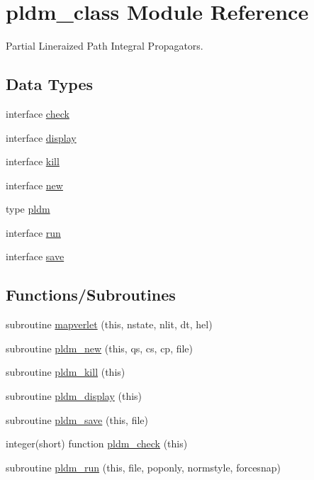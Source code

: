 \hypertarget{namespacepldm__class}{}\section{pldm\+\_\+class Module Reference}
\label{namespacepldm__class}


Partial Lineraized Path Integral Propagators.  


\subsection*{Data Types}
\begin{DoxyCompactItemize}
\item 
interface \hyperlink{interfacepldm__class_1_1check}{check}
\item 
interface \hyperlink{interfacepldm__class_1_1display}{display}
\item 
interface \hyperlink{interfacepldm__class_1_1kill}{kill}
\item 
interface \hyperlink{interfacepldm__class_1_1new}{new}
\item 
type \hyperlink{structpldm__class_1_1pldm}{pldm}
\item 
interface \hyperlink{interfacepldm__class_1_1run}{run}
\item 
interface \hyperlink{interfacepldm__class_1_1save}{save}
\end{DoxyCompactItemize}
\subsection*{Functions/\+Subroutines}
\begin{DoxyCompactItemize}
\item 
subroutine \hyperlink{namespacepldm__class_a56bc2a02f61ba7f0ef59c429a9f1e038}{mapverlet} (this, nstate, nlit, dt, hel)
\item 
subroutine \hyperlink{namespacepldm__class_a12da2274f89c7978903a0e5de4c0a2a7}{pldm\+\_\+new} (this, qs, cs, cp, file)
\item 
subroutine \hyperlink{namespacepldm__class_ae3cf3688fae95f3ab1729475a8fde0fd}{pldm\+\_\+kill} (this)
\item 
subroutine \hyperlink{namespacepldm__class_a0b7b20ee63a6203b24c700190738338b}{pldm\+\_\+display} (this)
\item 
subroutine \hyperlink{namespacepldm__class_aa71a81cb75e284923b6a6f8e4085c564}{pldm\+\_\+save} (this, file)
\item 
integer(short) function \hyperlink{namespacepldm__class_a87937cd139205ea96672b513c5124b8f}{pldm\+\_\+check} (this)
\item 
subroutine \hyperlink{namespacepldm__class_acb662f59407b2a0bd62fc36aab876482}{pldm\+\_\+run} (this, file, poponly, normstyle, forcesnap)
\end{DoxyCompactItemize}
